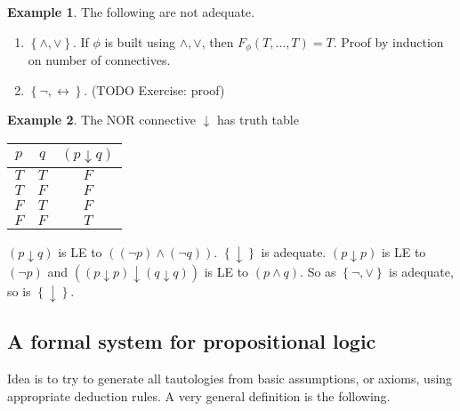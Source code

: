 \documentclass{article}
\newcommand{\rb}[1]{\left( #1 \right)}
\newcommand{\cb}[1]{\left\{ #1 \right\}}
\newcommand{\notb}[1]{\rb{\neg #1}}
\newcommand{\andb}[2]{\rb{#1 \land #2}}
\theoremstyle{definition}\newtheorem{definition}{Definition}[subsection]
\theoremstyle{definition}\newtheorem{remark}[definition]{Remark}
\theoremstyle{definition}\newtheorem*{example}{Example}
\theoremstyle{definition}\newtheorem*{note}{Note}
\begin{document}
\begin{example}
The following are not adequate.
\begin{enumerate}
\item $ \cb{\land, \lor} $. If $ \phi $ is built using $ \land, \lor $, then $ F_\phi\rb{T, \dots, T} = T $. Proof by induction on number of connectives.
\item $ \cb{\neg, \leftrightarrow} $. (TODO Exercise: proof)
\end{enumerate}
\end{example}

\begin{example}
The NOR connective $ \downarrow $ has truth table
\begin{center}
\begin{tabular}{|c|c|c|}
\hline
$ p $ & $ q $ & $ \rb{p \downarrow q} $ \\
\hline
$ T $ & $ T $ & $ F $ \\
\hline
$ T $ & $ F $ & $ F $ \\
\hline
$ F $ & $ T $ & $ F $ \\
\hline
$ F $ & $ F $ & $ T $ \\
\hline
\end{tabular}
\end{center}
$ \rb{p \downarrow q} $ is LE to $ \andb{\notb{p}}{\notb{q}} $. $ \cb{\downarrow} $ is adequate. $ \rb{p \downarrow p} $ is LE to $ \notb{p} $ and $ \rb{\rb{p \downarrow p} \downarrow \rb{q \downarrow q}} $ is LE to $ \andb{p}{q} $. So as $ \cb{\neg, \lor} $ is adequate, so is $ \cb{\downarrow} $.
\end{example}

\subsection{A formal system for propositional logic}

Idea is to try to generate all tautologies from basic assumptions, or axioms, using appropriate deduction rules. A very general definition is the following.
\end{document}
